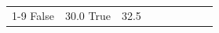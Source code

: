 \begin{table}[H]
\begin{tabular}{lllrlllll}
\cline{1-9}
False & 30.0%
\cline{1-9}
True & 32.5%

\end{tabular}
\end{table}
